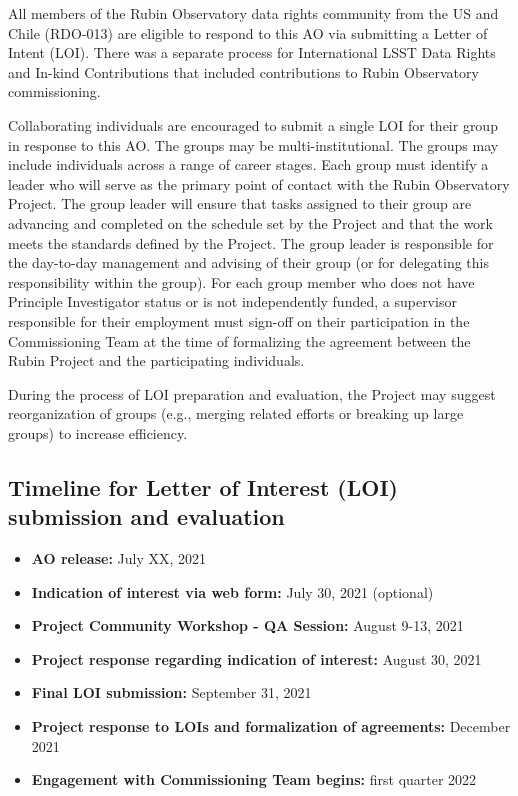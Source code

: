 \documentclass[SE,authoryear,toc]{lsstdoc}
\begin{document}
All members of the Rubin Observatory data rights community from the US and Chile (RDO-013) are eligible to respond to this AO via submitting a Letter of Intent (LOI). There was a separate process for International LSST Data Rights and In-kind Contributions that included contributions to Rubin Observatory commissioning.

Collaborating individuals are encouraged to submit a single LOI for their group in response to this AO. The groups may be multi-institutional. The groups may include individuals across a range of career stages. Each group must identify a leader who will serve as the primary point of contact with the Rubin Observatory Project. The group leader will ensure that tasks assigned to their group are advancing and completed on the schedule set by the Project and that the work meets the standards defined by the Project. The group leader is responsible for the day-to-day management and advising of their group (or for delegating this responsibility within the group). For each group member who does not have Principle Investigator status or is not independently funded, a supervisor responsible for their employment must sign-off on their participation in the Commissioning Team at the time of formalizing the agreement between the Rubin Project and the participating individuals.

During the process of LOI preparation and evaluation, the Project may suggest reorganization of groups (e.g., merging related efforts or breaking up large groups) to increase efficiency.

\subsection{Timeline for Letter of Interest (LOI) submission and evaluation}

\begin{itemize}
\item \textbf{AO release:} July XX, 2021
\item \textbf{Indication of interest via web form:} July 30, 2021 (optional)
\item \textbf{Project Community Workshop - QA Session:} August 9-13, 2021
\item \textbf{Project response regarding indication of interest:} August 30, 2021
\item \textbf{Final LOI submission:} September 31, 2021
\item \textbf{Project response to LOIs and formalization of agreements:} December 2021
\item \textbf{Engagement with Commissioning Team begins:} first quarter 2022
\end{itemize}
\end{document}
